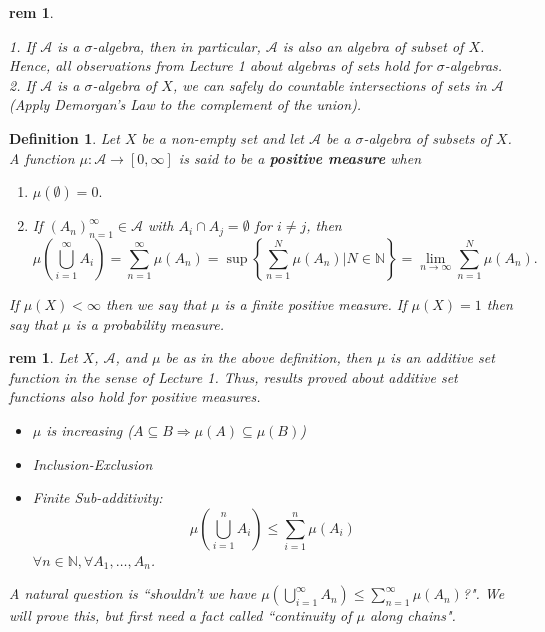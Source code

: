 \documentclass[letterpaper, 12pt]{article}
\newcommand{\fin}{\qquad \quad \hfill \framebox[1.75mm][l]{\,}}
\newcommand{\bN}{\mathbb{N}}
\newcommand{\sA}{\mathcal{A}}
\theoremstyle{stdthm}
\theoremstyle{stddef}
\newtheorem{defn}[thm]{Definition}
\newtheorem{rem}[thm]{rem} %
\theoremstyle{stdnonum}
\theoremstyle{stdqands}
\theoremstyle{stdbold}
\begin{document}
\begin{rem} $ $

1. If $\sA$ is a $\sigma$-algebra, then in particular, $\sA$ is also an algebra of subset of $X$. Hence, all observations from Lecture 1 about algebras of sets hold for $\sigma$-algebras.\\

2.  If $\sA$ is a $\sigma$-algebra of $X$, we can safely do countable intersections of sets in $\sA$ (Apply Demorgan's Law to the complement of the union).
\end{rem}

\begin{defn}
Let $X$ be a non-empty set and let $\sA$ be a $\sigma$-algebra of subsets of $X$. A function $\mu:\sA \rightarrow [0,\infty]$ is said to be a {\bf positive measure} when 
\begin{enumerate}
\item $\mu(\emptyset) = 0.$
\item If $\left(A_n\right)_{n=1}^\infty \in \sA$ with $A_i \cap A_j = \emptyset$ for $i\neq j$, then 
\[\mu\left( \bigcup_{i=1}^\infty A_i \right) = \sum_{n=1}^\infty \mu(A_n) = \sup\left\{\sum_{n=1}^N \mu(A_n)| N \in \bN \right\} = \lim_{n\rightarrow \infty} \sum_{n=1}^N \mu(A_n). \]
\end{enumerate}
If $\mu(X)<\infty$ then we say that $\mu$ is a finite positive measure. If $\mu(X) = 1$ then say that $\mu$ is a probability measure. 
\end{defn}

\begin{rem}
Let $X$, $\sA$, and $\mu$ be as in the above definition, then $\mu$ is an additive set function in the sense of Lecture 1. Thus, results proved about additive set functions also hold for positive measures. 
\begin{itemize}
\item $\mu$ is increasing ($A\subseteq B \Rightarrow \mu(A) \subseteq \mu(B)$)
\item Inclusion-Exclusion
\item Finite Sub-additivity:
\[\mu\left( \bigcup_{i=1}^n A_i \right) \leq \sum_{i=1}^n \mu(A_i) \]
$\forall n \in \bN, \forall A_1,\dots, A_n$. 
\end{itemize}
A natural question is ``shouldn't we have $\mu\left(\bigcup_{i=1}^\infty A_n \right) \leq \sum_{n=1}^\infty \mu(A_n)$?". We will prove this, but first need a fact called ``continuity of $\mu$ along chains". 
\end{rem}
\end{document}
